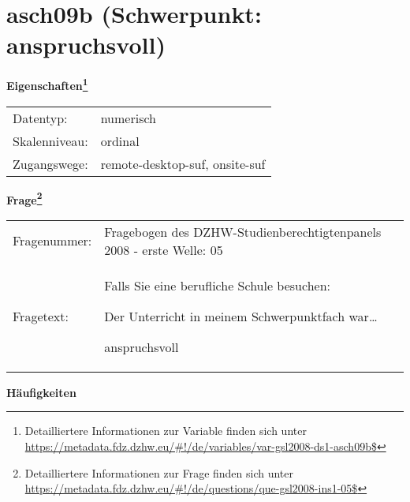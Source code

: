 
    \setcounter{footnote}{0}

    \vspace*{-1.8cm}
	\section{asch09b (Schwerpunkt: anspruchsvoll)}
	\label{section:asch09b}



    \vspace*{0.5cm}
    \noindent\textbf{Eigenschaften\footnote{Detailliertere Informationen zur Variable finden sich unter
		\url{https://metadata.fdz.dzhw.eu/\#!/de/variables/var-gsl2008-ds1-asch09b$}}}\\
	\begin{tabularx}{\hsize}{@{}lX}
	Datentyp: & numerisch \\
	Skalenniveau: & ordinal \\
	Zugangswege: &
	  remote-desktop-suf, 
	  onsite-suf
 \\
    \end{tabularx}



				\vspace*{0.5cm}
                \noindent\textbf{Frage\footnote{Detailliertere Informationen zur Frage finden sich unter
		              \url{https://metadata.fdz.dzhw.eu/\#!/de/questions/que-gsl2008-ins1-05$}}}\\
				\begin{tabularx}{\hsize}{@{}lX}
					Fragenummer: &
					  Fragebogen des DZHW-Studienberechtigtenpanels 2008 - erste Welle:
					  05
 \\
					Fragetext: & Falls Sie eine berufliche Schule besuchen:\par  Der Unterricht in meinem Schwerpunktfach war…\par  anspruchsvoll \\
				\end{tabularx}





        		\vspace*{0.5cm}
                \noindent\textbf{Häufigkeiten}

